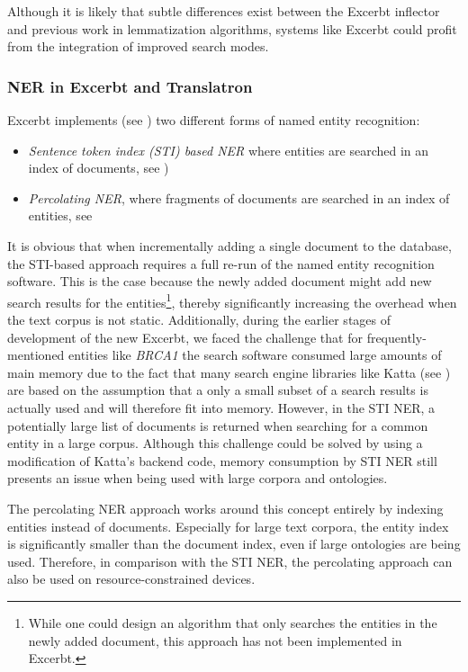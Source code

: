 \documentclass[a4paper, 12pt, twoside, reqn]{report}
\numberwithin{figure}{chapter}
\newtheorem[L]{boxedDefinition}{Definition}
\newtheorem[L]{boxedExample}{Example}
\begin{document}
Although it is likely that subtle differences exist between the Excerbt inflector and previous work in lemmatization algorithms, systems like Excerbt could profit from the integration of improved search modes.

\subsubsection{NER in Excerbt and Translatron}\label{sssec:ner-excerbt-translatron}

Excerbt implements (see \cite[section 4.3.1]{wachinger2013next}) two different forms of named entity recognition:
\begin{itemize}
 \item \textit{Sentence token index (STI) based NER} where entities are searched in an index of documents, see \cite[section 4.3]{wachinger2013next})

 \item \textit{Percolating NER}, where fragments of documents are searched in an index of entities, see \cite[section 4.3.1]{wachinger2013next}
\end{itemize}

It is obvious that when incrementally adding a single document to the database, the STI-based approach requires a full re-run of the named entity recognition software. This is the case because the newly added document might add new search results for the entities\footnote{While one could design an algorithm that only searches the entities in the newly added document, this approach has not been implemented in Excerbt.}, thereby significantly increasing the overhead when the text corpus is not static. Additionally, during the earlier stages of development of the new Excerbt, we faced the challenge that for frequently-mentioned entities like \textit{BRCA1} the search software consumed large amounts of main memory due to the fact that many search engine libraries like Katta (see \cite{katta}) are based on the assumption that a only a small subset of a search results is actually used and will therefore fit into memory. However, in the STI NER, a potentially large list of documents is returned when searching for a common entity in a large corpus. Although this challenge could be solved by using a modification of Katta's backend code, memory consumption by STI NER still presents an issue when being used with large corpora and ontologies.

The percolating NER approach works around this concept entirely by indexing entities instead of documents. Especially for large text corpora, the entity index is significantly smaller than the document index, even if large ontologies are being used. Therefore, in comparison with the STI NER, the percolating approach can also be used on resource-constrained devices.
\end{document}
